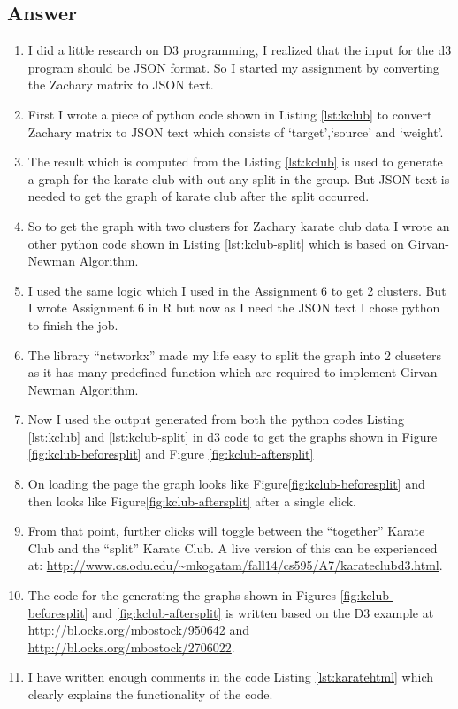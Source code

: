 \subsection{Answer}
\begin{enumerate}
\item I did a little research on D3 programming, I realized that the input for the d3 program should be JSON format. So I started my assignment by converting the Zachary matrix to JSON text.
\item First I wrote a piece of python code shown in Listing \ref{lst:kclub} to convert Zachary matrix to JSON text which consists of `target',`source' and `weight'. 
\item The result which is computed from the Listing \ref{lst:kclub} is used to generate a graph for the karate club with out any split in the group. But JSON text is needed to get the graph of karate club after the split occurred.
\item So to get the graph with two clusters for Zachary karate club data I wrote an other python code shown in Listing \ref{lst:kclub-split} which is based on Girvan-Newman Algorithm. 
\item I used the same logic which I used in the Assignment 6 to get 2 clusters. But I wrote Assignment 6 in R but now as I need the JSON text I chose python to finish the job.
\item The library ``networkx'' made my life easy to split the graph into 2 cluseters as it has many predefined function which are required to implement Girvan-Newman Algorithm.
\item Now I used the output generated from both the python codes Listing \ref{lst:kclub} and \ref{lst:kclub-split} in d3 code to get the graphs shown in Figure \ref{fig:kclub-beforesplit} and Figure \ref{fig:kclub-aftersplit}
\item  On loading the page the graph looks like Figure\ref{fig:kclub-beforesplit} and then looks like Figure\ref{fig:kclub-aftersplit} after a single click.
\item From that point, further clicks will toggle between the ``together'' Karate Club and the ``split'' Karate Club. A live version of this can be experienced at: \url{http://www.cs.odu.edu/~mkogatam/fall14/cs595/A7/karateclubd3.html}.    
\item The code for the generating the graphs shown in Figures \ref{fig:kclub-beforesplit} and \ref{fig:kclub-aftersplit} is written based on the D3 example at \url{ http://bl.ocks.org/mbostock/95064}2 and \url{http://bl.ocks.org/mbostock/2706022}. 
\item I have written enough comments in the code Listing 
\ref{lst:karatehtml} which clearly explains the functionality of the code.


\end{enumerate}
\newpage


